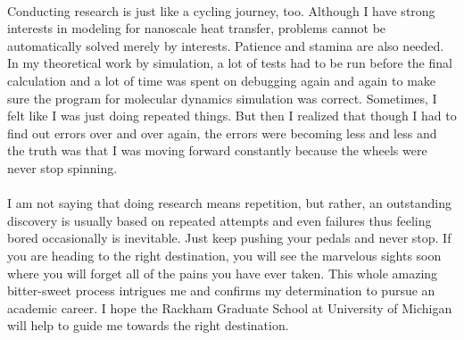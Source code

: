 \documentclass[a4paper,10pt]{article}
\begin{document}
\begin{spacing}{1.5}
\\
Conducting research is just like a cycling journey, too. Although I have strong interests in modeling for nanoscale heat transfer, problems cannot be automatically solved merely by interests. Patience and stamina are also needed. In my theoretical work by simulation, a lot of tests had to be run before the final calculation and a lot of time was spent on debugging again and again to make sure the program for molecular dynamics simulation was correct. Sometimes, I felt like I was just doing repeated things. But then I realized that though I had to find out errors over and over again, the errors were becoming less and less and the truth was that I was moving forward constantly because the wheels were never stop spinning. \\
\\
I am not saying that doing research means repetition, but rather, an outstanding discovery is usually based on repeated attempts and even failures thus feeling bored occasionally is inevitable. Just keep pushing your pedals and never stop. If you are heading to the right destination, you will see the marvelous sights soon where you will forget all of the pains you have ever taken. This whole amazing bitter-sweet process intrigues me and confirms my determination to pursue an academic career. I hope the Rackham Graduate School at University of Michigan will help to guide me towards the right destination.
\end{spacing}
\end{document}
